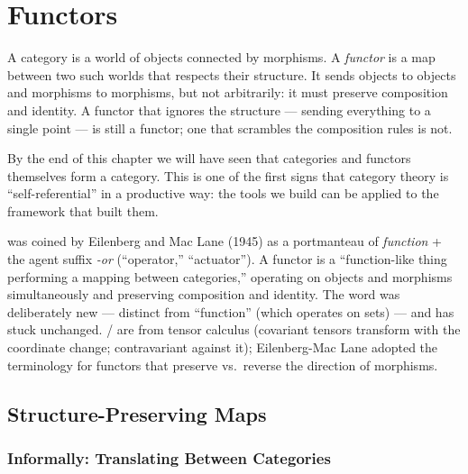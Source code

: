 \chapter{Functors}

\begin{overviewbox}
A category is a world of objects connected by morphisms. A \emph{functor} is
a map between two such worlds that respects their structure. It sends objects
to objects and morphisms to morphisms, but not arbitrarily: it must preserve
composition and identity. A functor that ignores the structure --- sending
everything to a single point --- is still a functor; one that scrambles the
composition rules is not.

By the end of this chapter we will have seen that categories and functors
themselves form a category. This is one of the first signs that category theory
is ``self-referential'' in a productive way: the tools we build can be applied
to the framework that built them.
\end{overviewbox}


\begin{nameorigin}
 was coined by Eilenberg and Mac Lane (1945) as a
portmanteau of \emph{function} + the agent suffix \emph{-or}
(``operator,'' ``actuator''). A functor is a ``function-like thing
performing a mapping between categories,'' operating on objects and
morphisms simultaneously and preserving composition and identity. The
word was deliberately new — distinct from ``function'' (which operates
on sets) — and has stuck unchanged.  / 
are from tensor calculus (covariant tensors transform with the
coordinate change; contravariant against it); Eilenberg-Mac Lane
adopted the terminology for functors that preserve vs.\ reverse the
direction of morphisms.
\end{nameorigin}

\section{Structure-Preserving Maps}
\label{sec:structure-preserving}

\subsection{Informally: Translating Between Categories}

